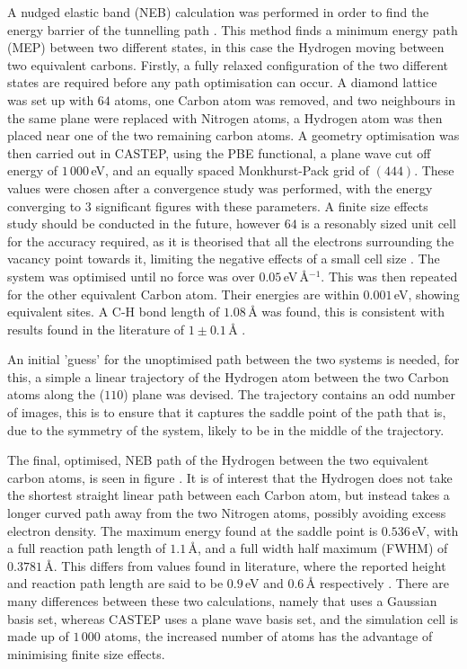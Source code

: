 \documentclass[10pt,a4paper,twocolumn,twoside]{extarticle}
\begin{document}
A nudged elastic band (NEB) calculation was performed in order to find the energy barrier of the tunnelling path \cite{NEB}.
This method finds a minimum energy path (MEP) between two different states, in this case the Hydrogen moving between two equivalent carbons.
Firstly, a fully relaxed configuration of the two different states are required before any path optimisation can occur.
A diamond lattice was set up with $64$ atoms, one Carbon atom was removed, and two neighbours in the same plane were replaced with Nitrogen atoms, a Hydrogen atom was then placed near one of the two remaining carbon atoms. A geometry optimisation was then carried out in CASTEP, using the PBE functional, a plane wave cut off energy of $1\,000$\,eV, and an equally spaced Monkhurst-Pack grid of $(4 4 4)$. These values were chosen after a convergence study was performed, with the energy converging to 3 significant figures with these parameters. A finite size effects study should be conducted in the future, however $64$ is a resonably sized unit cell for the accuracy required, as it is theorised that all the electrons surrounding the vacancy point towards it, limiting the negative effects of a small cell size \cite{NVCage}. The system was optimised until no force was over $0.05$\,eV\,\AA$^{-1}$. This was then repeated for the other equivalent Carbon atom. Their energies are within $0.001$\,eV, showing equivalent sites. A C-H bond length of $1.08$\,{\AA} was found, this is consistent with results found in the literature of $1 \pm 0.1$\,{\AA} \cite{N2VH_CH_Bond}.

An initial 'guess' for the unoptimised path between the two systems is needed, for this, a simple a linear trajectory of the Hydrogen atom between the two Carbon atoms along the ($110$) plane was devised. The trajectory contains an odd number of images, this is to ensure that it captures the saddle point of the path that is, due to the symmetry of the system, likely to be in the middle of the trajectory. 

The final, optimised, NEB path of the Hydrogen between the two equivalent carbon atoms, is seen in figure . It is of interest that the Hydrogen does not take the shortest straight linear path between each Carbon atom, but instead takes a longer curved path away from the two Nitrogen atoms, possibly avoiding excess electron density. The maximum energy found at the saddle point is $0.536$\,eV, with a full reaction path length of $1.1$\,\AA, and a full width half maximum (FWHM) of $0.3781$\,\AA. This differs from values found in literature, where the reported height and reaction path length are said to be $0.9$\,eV and $0.6$\,{\AA} respectively \cite{Peaker}. There are many differences between these two calculations, namely that \textcite{Peaker} uses a Gaussian basis set, whereas CASTEP uses a plane wave basis set, and the simulation cell is made up of $1\,000$ atoms, the increased number of atoms has the advantage of minimising finite size effects. 
\end{document}
